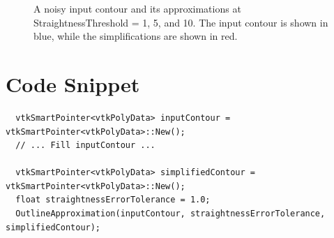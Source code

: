 \documentclass{InsightArticle}
\begin{document}
\begin{figure}[H]
\centering
{}
\caption{A noisy input contour and its approximations at StraightnessThreshold = 1, 5, and 10. The input contour is shown in blue, while the simplifications are shown in red.}
\label{fig:NoisyDemo}
\end{figure}


\section{Code Snippet}

\begin{verbatim}
  vtkSmartPointer<vtkPolyData> inputContour = vtkSmartPointer<vtkPolyData>::New();
  // ... Fill inputContour ...

  vtkSmartPointer<vtkPolyData> simplifiedContour = vtkSmartPointer<vtkPolyData>::New();
  float straightnessErrorTolerance = 1.0;
  OutlineApproximation(inputContour, straightnessErrorTolerance, simplifiedContour);
 
\end{verbatim}
\end{document}
